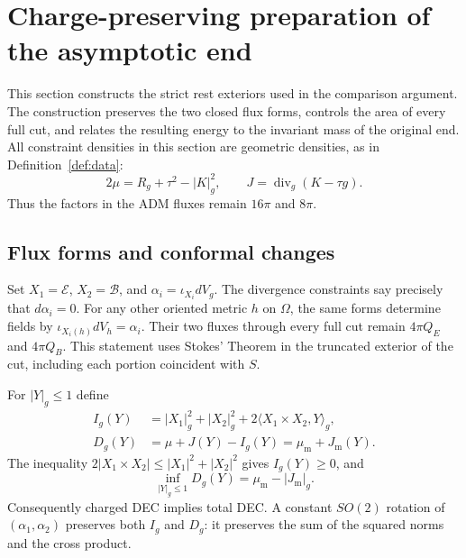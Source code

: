 \section{Charge-preserving preparation of the asymptotic end}
\label{en:section}

This section constructs the strict rest exteriors used in the comparison
argument. The construction preserves the two closed flux forms, controls
the area of every full cut, and relates the resulting energy to the
invariant mass of the original end. All constraint densities in this
section are geometric densities, as in Definition~\ref{def:data}:
\[
 2\mu=R_g+\tau^2-|K|_g^2,
 \qquad J=\operatorname{div}_g(K-\tau g).
\]
Thus the factors in the ADM fluxes remain $16\pi$ and $8\pi$.

\subsection{Flux forms and conformal changes}

Set $X_1=\mathcal E$, $X_2=\mathcal B$, and
$\alpha_i=\iota_{X_i}dV_g$. The divergence constraints say precisely
that $d\alpha_i=0$. For any other oriented metric $h$ on $\Omega$,
the same forms determine fields by $\iota_{X_i(h)}dV_h=\alpha_i$.
Their two fluxes through every full cut remain $4\pi Q_E$ and
$4\pi Q_B$. This statement uses Stokes' Theorem in the truncated
exterior of the cut, including each portion coincident with $S$.

For $|Y|_g\leq1$ define
\begin{equation}\label{en:ball-tests}
 \begin{split}
 I_g(Y)&=|X_1|_g^2+|X_2|_g^2
             +2\langle X_1\times X_2,Y\rangle_g,\\
 D_g(Y)&=\mu+J(Y)-I_g(Y)
         =\mu_{\mathrm m}+J_{\mathrm m}(Y).
 \end{split}
\end{equation}
The inequality $2|X_1\times X_2|\leq |X_1|^2+|X_2|^2$ gives
$I_g(Y)\geq0$, and
\[
 \inf_{|Y|_g\leq1}D_g(Y)=\mu_{\mathrm m}-|J_{\mathrm m}|_g.
\]
Consequently charged DEC implies total DEC. A constant $SO(2)$ rotation
of $(\alpha_1,\alpha_2)$ preserves both $I_g$ and $D_g$: it preserves
the sum of the squared norms and the cross product.


